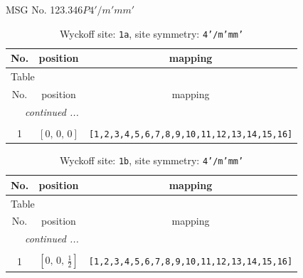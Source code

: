 \documentclass[fleqn,8pt]{jsarticle}
\begin{document}
\setcounter{MaxMatrixCols}{32}

\renewcommand{\tablename}{Table~}
\renewcommand{\figurename}{Figure~}
\begin{center}
\LARGE
MSG No. 123.346\quad$P4'/m'mm'$
\end{center}
\renewcommand{\arraystretch}{1.2}
\begin{longtable}{ccc}
\caption{Wyckoff site: {\tt 1a}, site symmetry: {\tt 4'/m'mm'}}
 \\
 \hline \hline
No. & position & mapping \\ \hline \endfirsthead

\multicolumn{2}{l}{\tablename\ \thetable{}} \\
 \hline \hline
No. & position & mapping \\ \hline \endhead

 \hline \hline
\multicolumn{2}{r}{\footnotesize\it continued ...} \\ \endfoot

 \hline \hline
\multicolumn{2}{r}{} \\ \endlastfoot

1 & $\left[ 0,\, 0,\, 0 \right]$ & {\tt [1,2,3,4,5,6,7,8,9,10,11,12,13,14,15,16]} \\
\end{longtable}
\renewcommand{\arraystretch}{1.2}
\begin{longtable}{ccc}
\caption{Wyckoff site: {\tt 1b}, site symmetry: {\tt 4'/m'mm'}}
 \\
 \hline \hline
No. & position & mapping \\ \hline \endfirsthead

\multicolumn{2}{l}{\tablename\ \thetable{}} \\
 \hline \hline
No. & position & mapping \\ \hline \endhead

 \hline \hline
\multicolumn{2}{r}{\footnotesize\it continued ...} \\ \endfoot

 \hline \hline
\multicolumn{2}{r}{} \\ \endlastfoot

1 & $\left[ 0,\, 0,\, \frac{1}{2} \right]$ & {\tt [1,2,3,4,5,6,7,8,9,10,11,12,13,14,15,16]} \\
\end{longtable}
\renewcommand{\arraystretch}{1.2}
\end{document}
